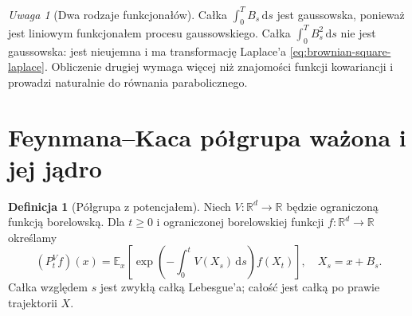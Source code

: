 \documentclass[11pt,a4paper,oneside]{report}
\numberwithin{equation}{chapter}
\theoremstyle{plain}
\theoremstyle{definition}
\newtheorem{definicja}{Definicja}[chapter]
\theoremstyle{remark}
\newtheorem{uwaga}{Uwaga}[chapter]
\newcommand{\R}{\mathbb{R}}
\newcommand{\E}{\mathbb{E}}
\newcommand{\dd}{\mathrm{d}}
\begin{document}
\begin{uwaga}[Dwa rodzaje funkcjonałów]
Całka $\int_0^T B_s\,\dd s$ jest gaussowska,
ponieważ jest liniowym funkcjonałem procesu
gaussowskiego. Całka $\int_0^T B_s^2\,\dd s$
nie jest gaussowska: jest nieujemna i ma transformację
Laplace'a \eqref{eq:brownian-square-laplace}.
Obliczenie drugiej wymaga więcej niż znajomości
funkcji kowariancji i prowadzi naturalnie do
równania parabolicznego.
\end{uwaga}

\section{Feynmana--Kaca półgrupa ważona i jej jądro}\label{sec:volIII:15:06}

\begin{definicja}[Półgrupa z potencjałem]\label{def:volIII:15:03}
\label{def:path-weighted-semigroup}
Niech $V:\R^d\to\R$ będzie ograniczoną funkcją borelowską.
Dla $t\ge0$ i ograniczonej borelowskiej funkcji
$f:\R^d\to\R$ określamy
\[
 (P_t^Vf)(x)=\E_x\left[
 \exp\left(-\int_0^tV(X_s)\,\dd s\right)f(X_t)\right],
 \quad X_s=x+B_s.
\tag{15.8}\label{eq:path-FK-semigroup}
\]
Całka względem $s$ jest zwykłą całką Lebesgue'a;
całość jest całką po prawie trajektorii $X$.
\end{definicja}
\end{document}
